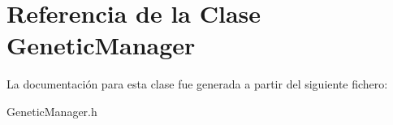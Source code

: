 \hypertarget{classGeneticManager}{}\section{Referencia de la Clase Genetic\+Manager}
\label{classGeneticManager}


La documentación para esta clase fue generada a partir del siguiente fichero\+:\begin{DoxyCompactItemize}
\item 
Genetic\+Manager.\+h\end{DoxyCompactItemize}
